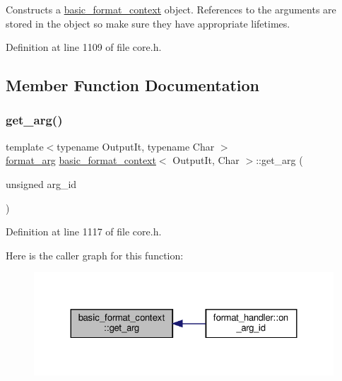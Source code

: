 Constructs a {\ttfamily \hyperlink{classbasic__format__context}{basic\+\_\+format\+\_\+context}} object. References to the arguments are stored in the object so make sure they have appropriate lifetimes. 

Definition at line 1109 of file core.\+h.



\subsection{Member Function Documentation}
\mbox{\label{classbasic__format__context_a556848fa995f593aeb9605dcbc62ec76}} 
\subsubsection{\texorpdfstring{get\+\_\+arg()}{get\_arg()}\hspace{0.1cm}{\footnotesize\ttfamily [1/2]}}
{\footnotesize\ttfamily template$<$typename Output\+It, typename Char $>$ \\
\hyperlink{classbasic__format__arg}{format\+\_\+arg} \hyperlink{classbasic__format__context}{basic\+\_\+format\+\_\+context}$<$ Output\+It, Char $>$\+::get\+\_\+arg (\begin{DoxyParamCaption}\item[{unsigned}]{arg\+\_\+id }\end{DoxyParamCaption})\hspace{0.3cm}{\ttfamily [inline]}}



Definition at line 1117 of file core.\+h.

Here is the caller graph for this function\+:
\nopagebreak
\begin{figure}[H]
\begin{center}
\leavevmode
\includegraphics[width=324pt]{classbasic__format__context_a556848fa995f593aeb9605dcbc62ec76_icgraph}
\end{center}
\end{figure}
\mbox{\label{classbasic__format__context_a251d1e5b73671a838b7937bac2dc6aff}} 
